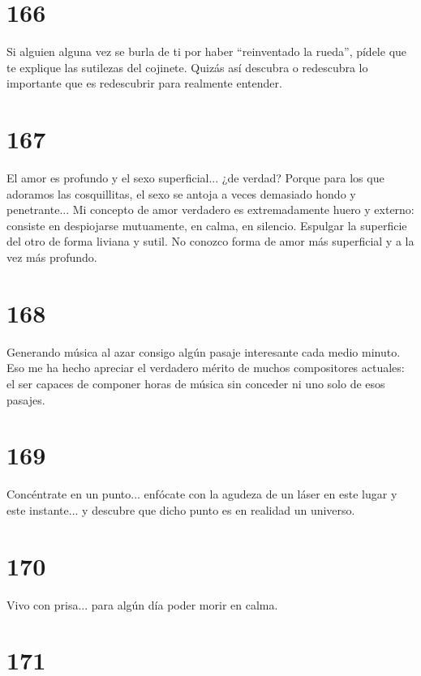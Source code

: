 \documentclass[a4paper,11pt,openright,twocolumn]{book}
\begin{document}
\section*{166}

Si alguien alguna vez se burla de ti por haber ``reinventado la rueda'', pídele que te explique las
sutilezas del cojinete. Quizás así descubra o redescubra lo importante que es redescubrir para 
realmente entender. 


\section*{167}

El amor es profundo y el sexo superficial... ¿de verdad? Porque para los que adoramos las cosquillitas,
el sexo se antoja a veces demasiado hondo y penetrante... Mi concepto de amor verdadero es extremadamente
huero y externo: consiste en despiojarse mutuamente, en calma, en silencio. Espulgar la superficie del otro
de forma liviana y sutil. No conozco forma de amor más superficial y a la vez más profundo. 

\section*{168}

Generando música al azar consigo algún pasaje interesante cada medio minuto. Eso me ha hecho apreciar
el verdadero mérito de muchos compositores actuales: el ser capaces de componer horas de música sin 
conceder ni uno solo de esos pasajes. 

\section*{169}

Concéntrate en un punto... enfócate con la agudeza de un láser en este lugar y este instante... y descubre
que dicho punto es en realidad un universo.

\section*{170}

Vivo con prisa... para algún día poder morir en calma.

\section*{171}
\end{document}
